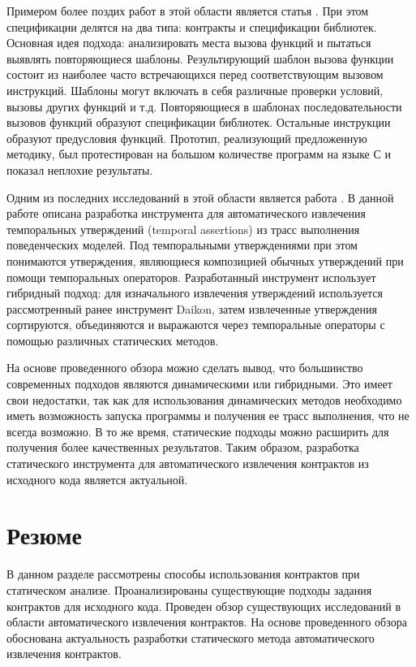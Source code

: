 Примером более поздих работ в этой области является статья \cite{staticPredicateMining}. При этом спецификации делятся на два типа: контракты и спецификации библиотек. Основная идея подхода: анализировать места вызова функций и пытаться выявлять повторяющиеся шаблоны. Результирующий шаблон вызова функции состоит из наиболее часто встречающихся перед соответствующим вызовом инструкций. Шаблоны могут включать в себя различные проверки условий, вызовы других функций и т.д. Повторяющиеся в шаблонах последовательности вызовов функций образуют спецификации библиотек. Остальные инструкции образуют предусловия функций. Прототип, реализующий предложенную методику, был протестирован на большом количестве программ на языке С и показал неплохие результаты.

Одним из последних исследований в этой области является работа \cite{automiticAssertionsExtraction}. В данной работе описана разработка инструмента для автоматического извлечения темпоральных утверждений (temporal assertions) из трасс выполнения поведенческих моделей. Под темпоральными утверждениями при этом понимаются утверждения, являющиеся композицией обычных утверждений при помощи темпоральных операторов. Разработанный инструмент использует гибридный подход: для изначального извлечения утверждений используется рассмотренный ранее инструмент Daikon, затем извлеченные утверждения сортируются, объединяются и выражаются через темпоральные операторы с помощью различных статических методов.

На основе проведенного обзора можно сделать вывод, что большинство современных подходов являются динамическими или гибридными. Это имеет свои недостатки, так как для использования динамических методов необходимо иметь возможность запуска программы и получения ее трасс выполнения, что не всегда возможно. В то же время,  статические подходы можно расширить для получения более качественных результатов. Таким образом, разработка статического инструмента для автоматического извлечения контрактов из исходного кода является актуальной.

\section{Резюме}
В данном разделе рассмотрены способы использования контрактов при статическом анализе. Проанализированы существующие подходы задания контрактов для исходного кода. Проведен обзор существующих исследований в области автоматического извлечения контрактов. На основе проведенного обзора обоснована актуальность разработки статического метода автоматического извлечения контрактов.